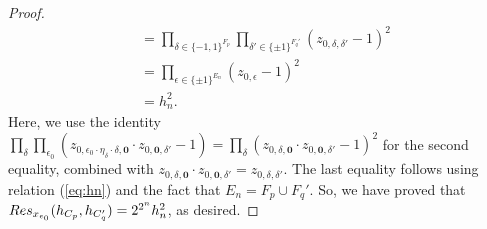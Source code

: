 \documentclass[10pt,a4paper]{amsart}
\newcommand{\azero}{\mathbf{0}}
\begin{document}
\begin{proof}
\begin{align*}
&=
\prod_{\delta \in \{-1,1\}^{F_p}}  \prod_{\delta'\in\{\pm 1\}^{F_q'}}
(z_{0,\delta,\delta'}-1)^2\\
&= \prod_{\epsilon\in \{\pm 1\}^{E_n}} (z_{0,\epsilon}-1)^2\\
&= h_n^2.
\end{align*}
Here,  we use  the identity
$\prod_\delta\prod_{\epsilon_0}(z_{0,\epsilon_0\cdot\eta_\delta \cdot \delta,\azero}\cdot z_{0,\azero,\delta'}-1)=\prod_\delta 
(z_{0,\delta,\azero}\cdot z_{0,\azero,\delta'}-1)^2$ for the second equality, combined with $z_{0,\delta,\azero}\cdot z_{0,\azero,\delta'}=z_{0,\delta,\delta'}$. 
The last equality follows using relation (\ref{eq:hn}) and the fact that $E_n=F_p\cup F_q'$.
So, we have proved that ${\rm Res}_{x_{e_0}}(h_{C_p}, h_{C_q'})=2^{2^{n}} h_n^2$, as desired.
\end{proof}
\end{document}
